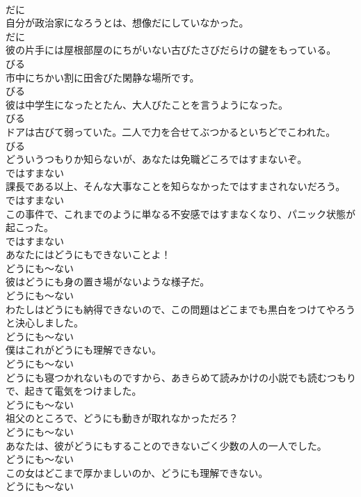 \documentclass[8pt]{extreport}
\begin{document}
\begin{CJK}{UTF8}{min}
\\	だに	
\\	自分が政治家になろうとは、想像だにしていなかった。	
\\	だに	
\\	彼の片手には屋根部屋のにちがいない古びたさびだらけの鍵をもっている。	
\\	びる	
\\	市中にちかい割に田舎びた閑静な場所です。	
\\	びる	
\\	彼は中学生になったとたん、大人びたことを言うようになった。	
\\	びる	
\\	ドアは古びて弱っていた。二人で力を合せてぶつかるといちどでこわれた。	
\\	びる	
\\	どういうつもりか知らないが、あなたは免職どころではすまないぞ。	
\\	ではすまない	
\\	課長である以上、そんな大事なことを知らなかったではすまされないだろう。	
\\	ではすまない	
\\	この事件で、これまでのように単なる不安感ではすまなくなり、パニック状態が起こった。	
\\	ではすまない	
\\	あなたにはどうにもできないことよ！	
\\	どうにも～ない	
\\	彼はどうにも身の置き場がないような様子だ。	
\\	どうにも～ない	
\\	わたしはどうにも納得できないので、この問題はどこまでも黒白をつけてやろうと決心しました。	
\\	どうにも～ない	
\\	僕はこれがどうにも理解できない。	
\\	どうにも～ない	
\\	どうにも寝つかれないものですから、あきらめて読みかけの小説でも読むつもりで、起きて電気をつけました。	
\\	どうにも～ない	
\\	祖父のところで、どうにも動きが取れなかっただろ？	
\\	どうにも～ない	
\\	あなたは、彼がどうにもすることのできないごく少数の人の一人でした。	
\\	どうにも～ない	
\\	この女はどこまで厚かましいのか、どうにも理解できない。	
\\	どうにも～ない	

\end{CJK}
\end{document}
